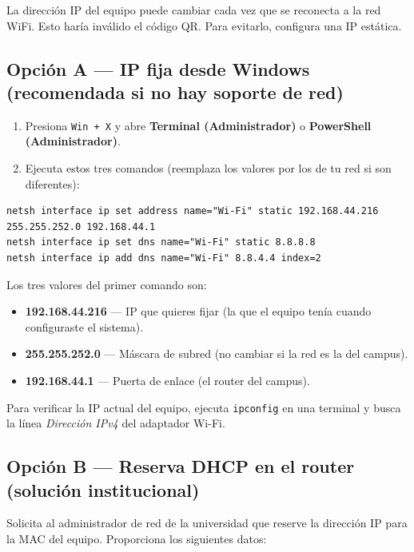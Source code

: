 \documentclass[12pt, a4paper]{article}
\begin{document}
La dirección IP del equipo puede cambiar cada vez que se reconecta
a la red WiFi. Esto haría inválido el código QR. Para evitarlo,
configura una IP estática.

\subsection{Opción A — IP fija desde Windows (recomendada si no hay soporte de red)}

\begin{enumerate}
  \item Presiona \texttt{Win + X} y abre \textbf{Terminal (Administrador)}
        o \textbf{PowerShell (Administrador)}.
  \item Ejecuta estos tres comandos (reemplaza los valores por los de
        tu red si son diferentes):
\end{enumerate}

\begin{lstlisting}
netsh interface ip set address name="Wi-Fi" static 192.168.44.216 255.255.252.0 192.168.44.1
netsh interface ip set dns name="Wi-Fi" static 8.8.8.8
netsh interface ip add dns name="Wi-Fi" 8.8.4.4 index=2
\end{lstlisting}

\begin{nota}
  Los tres valores del primer comando son:
  \begin{itemize}
    \item \textbf{192.168.44.216} — IP que quieres fijar (la que el equipo
          tenía cuando configuraste el sistema).
    \item \textbf{255.255.252.0} — Máscara de subred (no cambiar si la red
          es la del campus).
    \item \textbf{192.168.44.1} — Puerta de enlace (el router del campus).
  \end{itemize}
  Para verificar la IP actual del equipo, ejecuta \texttt{ipconfig} en una
  terminal y busca la línea \emph{Dirección IPv4} del adaptador Wi-Fi.
\end{nota}

\subsection{Opción B — Reserva DHCP en el router (solución institucional)}

Solicita al administrador de red de la universidad que reserve la
dirección IP para la MAC del equipo. Proporciona los siguientes datos:
\end{document}

